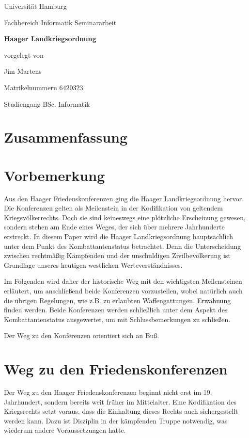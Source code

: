 \documentclass[12pt]{scrartcl}
\begin{document}
\newpage
\thispagestyle{empty}
\begin{center}\Large
Universität Hamburg \par
Fachbereich Informatik
\vfill
Seminararbeit
\vfill
{\Large\textsf{\textbf{Haager Landkriegsordnung}}\par}
\vfill
vorgelegt von 
\par\bigskip
Jim Martens \par
Matrikelnummern 6420323 \par
Studiengang BSc. Informatik
\end{center}

\newpage
\section*{Zusammenfassung}

\newpage
\tableofcontents

\newpage
\section{Vorbemerkung}
Aus den Haager Friedenskonferenzen ging die Haager Landkriegsordnung hervor. Die Konferenzen gelten als Meilenstein in der Kodifikation von geltendem Kriegsvölkerrechts. Doch sie sind keineswegs eine plötzliche Erscheinung gewesen, sondern stehen am Ende eines Weges, der sich über mehrere Jahrhunderte erstreckt. In diesem Paper wird die Haager Landkriegsordnung hauptsächlich unter dem Punkt des Kombattantenstatus betrachtet. Denn die Unterscheidung zwischen rechtmäßig Kämpfenden und der unschuldigen Zivilbevölkerung ist Grundlage unseres heutigen westlichen Werteverständnisses.

Im Folgenden wird daher der historische Weg mit den wichtigsten Meilensteinen erläutert, um anschließend beide Konferenzen vorzustellen, wobei natürlich auch die übrigen Regelungen, wie z.B. zu erlaubten Waffengattungen, Erwähnung finden werden. Beide Konferenzen werden schließlich unter dem Aspekt des Kombattantenstatus ausgewertet, um mit Schlussbemerkungen zu schließen.

Der Weg zu den Konferenzen orientiert sich an Buß\cite{Buss1992}.
\section{Weg zu den Friedenskonferenzen}
Der Weg zu den Haager Friedenskonferenzen beginnt nicht erst im 19. Jahrhundert, sondern bereits weit früher im Mittelalter. Eine Kodifikation des Kriegsrechts setzt voraus, dass die Einhaltung dieses Rechts auch sichergestellt werden kann. Dazu ist Disziplin in der kämpfenden Truppe notwendig, was wiederum andere Voraussetzungen hatte.
\end{document}
